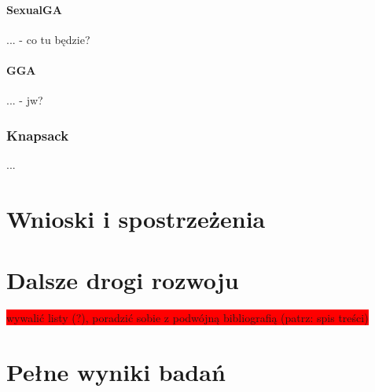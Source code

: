 \documentclass[twoside]{iisthesis}
\newcommand{\todo}{\colorbox{red}}
\begin{document}
\subsubsection{SexualGA}
... - co tu będzie?
\subsubsection{GGA}
... - jw?
\subsection{Knapsack}
...


\chapter{Wnioski i spostrzeżenia}
\chapter{Dalsze drogi rozwoju}



\pagestyle{plain}

\todo{wywalić listy (?), poradzić sobie z podwójną bibliografią (patrz: spis treści)}

\listoffigures
\listoftables
{}




\appendix \chapter{Pełne wyniki badań}
\end{document}
